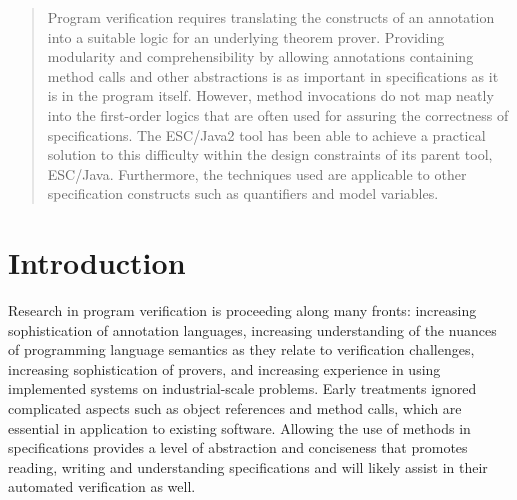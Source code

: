 \documentclass{sig-alternate}
\newif\ifpdf
\begin{document}


\date{27 March 2004}

\newcommand{\myhref}[2]{\ifpdf\href{#1}{#2}\else\htmladdnormallinkfoot{#2}{#1}\fi}

\maketitle
\begin{abstract}
Program verification requires translating the constructs of an annotation 
into a suitable logic for an underlying theorem prover.   Providing modularity
and comprehensibility by allowing 
annotations containing method calls and other abstractions is as important in 
specifications as it is in the program itself.  However, method invocations do not
map neatly into the first-order logics that are often used for assuring the correctness
of specifications.  The ESC/Java2 tool
has been able to achieve a practical solution to this difficulty within the design constraints
of its parent tool, ESC/Java.  Furthermore, the techniques used are applicable to other
specification constructs such as quantifiers and model variables.

\end{abstract}




\section{Introduction}

Research in program verification is proceeding along many fronts: 
increasing sophistication of annotation languages, increasing
understanding of the nuances of programming language semantics as they
relate to verification challenges, increasing sophistication of 
provers, and increasing experience in using implemented systems on
industrial-scale problems.  Early treatments ignored complicated
aspects such as object references and method calls, which are
essential in application to existing software.  Allowing
the use of methods in specifications provides a level of abstraction 
and conciseness that
promotes reading, writing and understanding specifications and will 
likely assist in their automated verification as well.  
\end{document}
